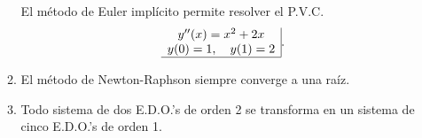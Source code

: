 \documentclass[11pt]{article}
\begin{document}
\begin{enumerate}
\begin{enumerate}
\fbox{ \begin{minipage}{1cm}   \hfill\vspace{1cm}   		
    \end{minipage} } 
    \begin{minipage}{0.4\textwidth}
	El método de Euler impl\'icito permite resolver el P.V.C.
    $$
    \begin{array}{c|}
    y''(x)=x^2+2x\\
    y(0)=1,\quad y(1)=2\\ \hline
    \end{array}.
    $$
    \end{minipage} 
    \begin{minipage}{0.4\textwidth}
    \end{minipage}
\item
\fbox{ \begin{minipage}{1cm}   \hfill\vspace{1cm}   		
    \end{minipage} } 
    \begin{minipage}{0.4\textwidth}
    El m\'etodo de Newton-Raphson siempre converge a una ra\'iz.
    \end{minipage} 
    \begin{minipage}{0.4\textwidth}
    \end{minipage}
%
\item
\fbox{ \begin{minipage}{1cm}   \hfill\vspace{1cm}   		
    \end{minipage} } 
    \begin{minipage}{0.4\textwidth}
    Todo sistema de dos E.D.O.'s de orden 2 se transforma en un sistema de cinco E.D.O.'s de orden 1.
    \end{minipage} 
    \begin{minipage}{0.4\textwidth}
    \end{minipage}
\end{enumerate}
\end{enumerate}
\end{document}
